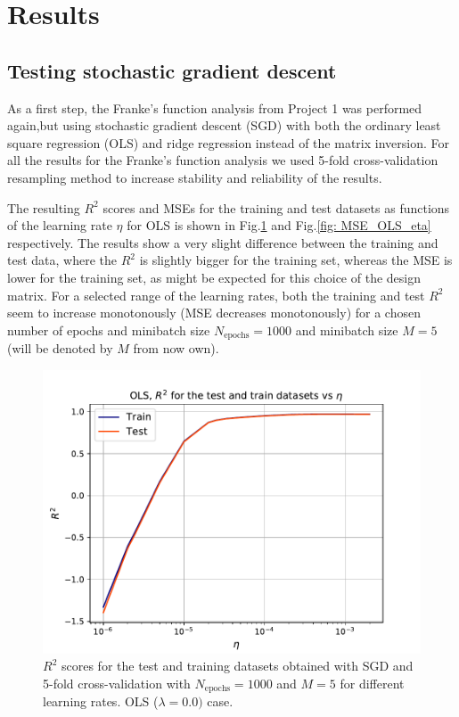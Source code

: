 \documentclass{emulateapj}
\begin{document}
\hspace{1cm}
\section{Results} 
\label{sec: Results}

\subsection{Testing stochastic gradient descent}
\label{subsec: Task 1}
As a first step, the Franke's  function analysis from Project 1 \cite{proj1, proj1_2} was performed again,but using stochastic gradient descent (SGD) with both the ordinary least square regression (OLS) and ridge regression instead of the matrix inversion. For all the results for the Franke's function analysis we used 5-fold cross-validation resampling method to increase stability and reliability of the results.

The resulting $R^{2}$ scores and MSEs for the training and test datasets as functions of the learning rate $\eta$ for OLS is shown in Fig.\ref{fig: R2_OLS_eta} and Fig.\ref{fig: MSE_OLS_eta} respectively. The results show a very slight difference between the training and test data, where the $R^{2}$ is slightly bigger for the training set, whereas the MSE is lower for the training set, as might be expected for this choice of the design matrix. For a selected range of the learning rates, both the training and test $R^{2}$ seem to increase monotonously (MSE decreases monotonously) for a chosen number of epochs and minibatch size $N_{\mathrm{epochs}}=1000$ and minibatch size $M=5$ (will be denoted by $M$ from now own).

\begin{figure}[h]
    \centering
    \includegraphics[width=.49\textwidth]{Figures/OLS_R2_eta.pdf}
    \caption{$R^2$ scores for the test and training datasets obtained with SGD and 5-fold cross-validation with $N_{\mathrm{epochs}}=1000$ and $M=5$ for different learning rates. OLS ($\lambda=0.0)$ case.}
    \label{fig: R2_OLS_eta}
\end{figure}
\end{document}
